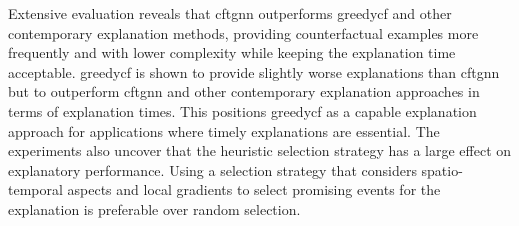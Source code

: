 Extensive evaluation reveals that \gls{cftgnn} outperforms \gls{greedycf} and other contemporary explanation methods, providing counterfactual examples more frequently and with lower complexity while keeping the explanation time acceptable.
\gls{greedycf} is shown to provide slightly worse explanations than \gls{cftgnn} but to outperform \gls{cftgnn} and other contemporary explanation approaches in terms of explanation times. This positions \gls{greedycf} as a capable explanation approach for applications where timely explanations are essential. The experiments also uncover that the heuristic selection strategy has a large effect on explanatory performance. Using a selection strategy that considers spatio-temporal aspects and local gradients to select promising events for the explanation is preferable over random selection.




